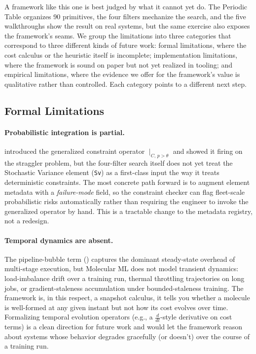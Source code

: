 \documentclass[10pt,twocolumn]{article}
\begin{document}
A framework like this one is best judged by what it cannot yet do. The Periodic Table organizes 90 primitives, the four filters mechanize the search, and the five walkthroughs show the result on real systems, but the same exercise also exposes the framework's seams. We group the limitations into three categories that correspond to three different kinds of future work: formal limitations, where the cost calculus or the heuristic itself is incomplete; implementation limitations, where the framework is sound on paper but not yet realized in tooling; and empirical limitations, where the evidence we offer for the framework's value is qualitative rather than controlled. Each category points to a different next step.

\subsection{Formal Limitations}


\paragraph{Probabilistic integration is partial.}  introduced the generalized constraint operator $\mid_{C,\, p > \theta}$ and showed it firing on the straggler problem, but the four-filter search itself does not yet treat the Stochastic Variance element (\texttt{Sv}) as a first-class input the way it treats deterministic constraints. The most concrete path forward is to augment element metadata with a \emph{failure-mode} field, so the constraint checker can flag fleet-scale probabilistic risks automatically rather than requiring the engineer to invoke the generalized operator by hand. This is a tractable change to the metadata registry, not a redesign.

\paragraph{Temporal dynamics are absent.} The pipeline-bubble term () captures the dominant steady-state overhead of multi-stage execution, but Molecular ML does not model transient dynamics: load-imbalance drift over a training run, thermal throttling trajectories on long jobs, or gradient-staleness accumulation under bounded-staleness training. The framework is, in this respect, a snapshot calculus, it tells you whether a molecule is well-formed at any given instant but not how its cost evolves over time. Formalizing temporal evolution operators (e.g., a $\frac{d}{dt}$-style derivative on cost terms) is a clean direction for future work and would let the framework reason about systems whose behavior degrades gracefully (or doesn't) over the course of a training run.
\end{document}
